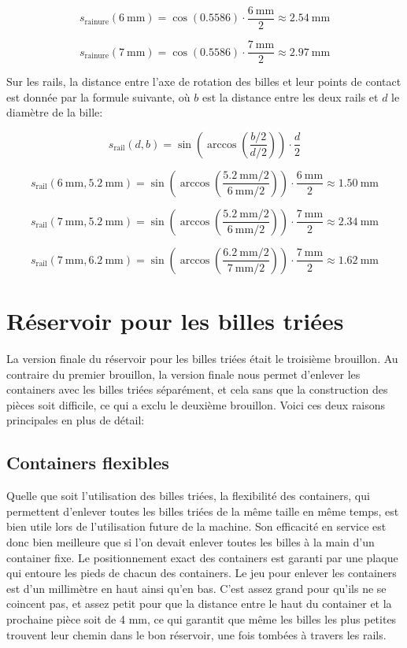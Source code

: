 \[s_{\text{rainure}}(\SI{6}{\milli\metre}) = \cos(0.5586) \cdot \frac{\SI{6}{\milli\metre}}{2} \approx \SI{2.54}{\milli\metre}\]

\[s_{\text{rainure}}(\SI{7}{\milli\metre}) = \cos(0.5586) \cdot \frac{\SI{7}{\milli\metre}}{2} \approx \SI{2.97}{\milli\metre}\]

Sur les rails, la distance entre l'axe de rotation des billes et leur points de contact est donnée par la formule suivante, où $b$ est la distance entre les deux rails et $d$ le diamètre de la bille:

\[s_{\text{rail}}(d,b) = \sin\left(\arccos\left(\frac{b/2}{d/2}\right)\right) \cdot \frac{d}{2}\]

\[s_{\text{rail}}(\SI{6}{\milli\metre},\SI{5.2}{\milli\metre}) = \sin\left(\arccos\left(\frac{\SI{5.2}{\milli\metre}/2}{\SI{6}{\milli\metre}/2}\right)\right) \cdot \frac{{\SI{6}{\milli\metre}}}{2} \approx \SI{1.50}{\milli\metre}\]

\[s_{\text{rail}}(\SI{7}{\milli\metre},\SI{5.2}{\milli\metre}) = \sin\left(\arccos\left(\frac{\SI{5.2}{\milli\metre}/2}{\SI{6}{\milli\metre}/2}\right)\right) \cdot \frac{{\SI{7}{\milli\metre}}}{2} \approx \SI{2.34}{\milli\metre}\]

\[s_{\text{rail}}(\SI{7}{\milli\metre},\SI{6.2}{\milli\metre}) = \sin\left(\arccos\left(\frac{\SI{6.2}{\milli\metre}/2}{\SI{7}{\milli\metre}/2}\right)\right) \cdot \frac{{\SI{7}{\milli\metre}}}{2} \approx \SI{1.62}{\milli\metre}\]


\section{Réservoir pour les billes triées}
La version finale du réservoir pour les billes triées était le troisième brouillon. Au contraire du premier brouillon, la version finale nous permet d'enlever les containers avec les billes triées séparément, et cela sans que la construction des pièces soit difficile, ce qui a exclu le deuxième brouillon. Voici ces deux raisons principales en plus de détail:

\subsection{Containers flexibles}
Quelle que soit l'utilisation des billes triées, la flexibilité des containers, qui permettent d'enlever toutes les billes triées de la même taille en même temps, est bien utile lors de l'utilisation future de la machine. Son efficacité en service est donc bien meilleure que si l'on devait enlever toutes les billes à la main d'un container fixe. Le positionnement exact des containers est garanti par une plaque %
qui entoure les pieds de chacun des containers. Le jeu pour enlever les containers est d'un millimètre en haut ainsi qu'en bas. C'est assez grand pour qu'ils ne se coincent pas, et assez petit pour que la distance entre le haut du container et la prochaine pièce soit de 4 mm, ce qui garantit que même les billes les plus petites trouvent leur chemin dans le bon réservoir, une fois tombées à travers les rails.

